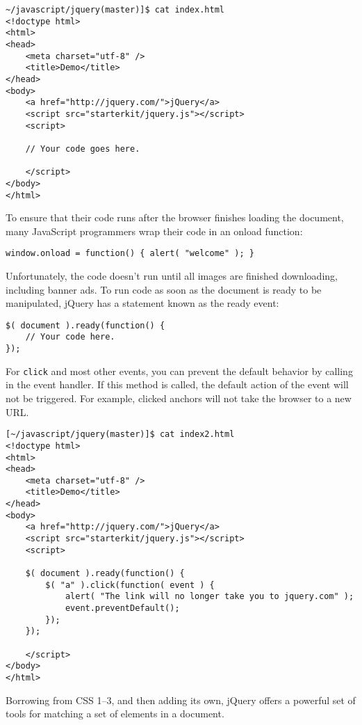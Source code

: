 \begin{verbatim}
~/javascript/jquery(master)]$ cat index.html 
<!doctype html>
<html>
<head>
    <meta charset="utf-8" />
    <title>Demo</title>
</head>
<body>
    <a href="http://jquery.com/">jQuery</a>
    <script src="starterkit/jquery.js"></script>
    <script>
 
    // Your code goes here.
 
    </script>
</body>
</html>
\end{verbatim}

To ensure that their code runs after the browser finishes loading the document, many JavaScript programmers wrap their code in an onload function:

\begin{verbatim}
window.onload = function() { alert( "welcome" ); }
\end{verbatim}

Unfortunately, the code doesn't run until all images are finished downloading, including banner ads. To run code as soon as the document is ready to be manipulated, jQuery has a statement known as the ready event:

\begin{verbatim}
$( document ).ready(function() {
    // Your code here.
});
\end{verbatim}
For \verb|click| and most other events, you can prevent the default
behavior by calling 
in the event handler.
If this method is called, the default action of the event will not be triggered.
For example, clicked anchors will not take the browser to a new URL.

\begin{verbatim}
[~/javascript/jquery(master)]$ cat index2.html 
<!doctype html>
<html>
<head>
    <meta charset="utf-8" />
    <title>Demo</title>
</head>
<body>
    <a href="http://jquery.com/">jQuery</a>
    <script src="starterkit/jquery.js"></script>
    <script>
 
    $( document ).ready(function() {
        $( "a" ).click(function( event ) {
            alert( "The link will no longer take you to jquery.com" );
            event.preventDefault();
        });
    });
 
    </script>
</body>
</html>
\end{verbatim}
Borrowing from CSS 1–3, and then adding its own, jQuery offers a powerful set of tools for matching a set of elements in a document.

